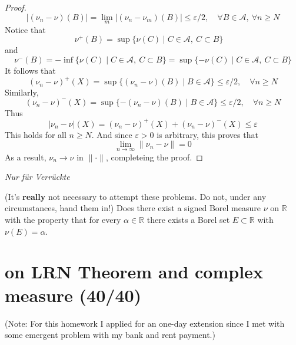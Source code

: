 \documentclass[lang=cn,11pt]{elegantbook}
\begin{document}
\begin{proof}
\[
|(\nu_n - \nu)(B)| = \lim_{m} |(\nu_n - \nu_m)(B)| \le \varepsilon / 2, \quad \forall B \in \mathcal{A},\ \forall n \ge N
\]Notice that
\[
\nu^+(B) = \sup\{\nu(C) \mid C \in \mathcal{A},\ C \subset B\}
\quad
\]and \[
\nu^-(B) =  - \inf\{\nu(C) \mid C \in \mathcal{A},\ C \subset B\}  =
\sup\{-\nu(C) \mid C \in \mathcal{A},\ C \subset B\}
\]
It follows that
\[
(\nu_n - \nu)^+(X) = \sup\{(\nu_n - \nu)(B) \mid B \in \mathcal{A}\} \le \varepsilon / 2, \quad \forall n \ge N
\]
Similarly,
\[
(\nu_n - \nu)^-(X) = \sup\{-(\nu_n - \nu)(B) \mid B \in \mathcal{A}\} \le \varepsilon /2,\quad \forall n \ge N
\]
Thus \[
|\nu_n - \nu | (X)  = (\nu_n - \nu)^+(X) + (\nu_n - \nu)^-(X) \leq \varepsilon
\]
This holds for all $n\geq N$. And since $\varepsilon > 0$ is arbitrary, this proves that \[
\lim_{n\to\infty} \|\nu_n - \nu\| = 0
\]
As a result, $\nu_n \to \nu$ in $\|\cdot\|$, completeing the proof.
\end{proof}



\vspace*{10mm}
\begin{center}
  \textit{Nur f\"ur Verr\"uckte}
\end{center}
(It's \textbf{really} not necessary to attempt these problems. Do not, under any circumstances, hand them in!)
Does there exist a signed Borel measure $\nu$ on $\mathbb{R}$ with the property that  for every $\alpha\in \mathbb{R}$ there exists a Borel set $E\subset\mathbb{R}$ with $\nu(E)=\alpha$.










\chapter{on LRN Theorem and complex measure (40/40)}
(Note: For this homework I applied for an one-day extension since I met with some emergent problem with my bank and rent payment.)
\end{document}
